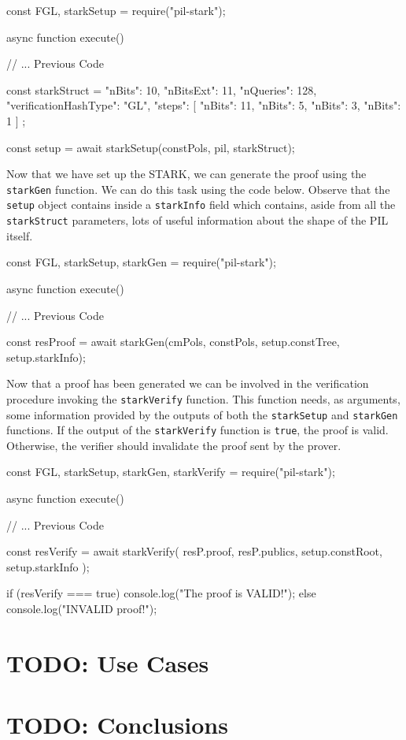 \begin{js}
const { FGL, starkSetup } = require("pil-stark");
    
async function execute() {
    
    // ... Previous Code	
    
    const starkStruct = {
        "nBits": 10,
        "nBitsExt": 11,
        "nQueries": 128,
        "verificationHashType": "GL",
        "steps": [
        {"nBits": 11},
        {"nBits": 5},
        {"nBits": 3},
        {"nBits": 1}
        ]
    };
        
    const setup = await starkSetup(constPols, pil, starkStruct);
}
\end{js}

Now that we have set up the STARK, we can generate the proof using the \texttt{starkGen} function. We can do this task using the code below. Observe that the \texttt{setup} object contains inside a \texttt{starkInfo} field which contains, aside from all the \texttt{starkStruct} parameters, lots of useful information about the shape of the PIL itself. 

\begin{js}
const { FGL, starkSetup, starkGen } = require("pil-stark");

async function execute() {
    
    // ... Previous Code	
    
    const resProof = await starkGen(cmPols, constPols, setup.constTree, setup.starkInfo);
}
\end{js}

Now that a proof has been generated we can be involved in the verification procedure invoking the \texttt{starkVerify} function. This function needs, as arguments, some information provided by the outputs of both the \texttt{starkSetup} and \texttt{starkGen} functions. If the output of the \texttt{starkVerify} function is \texttt{true}, the proof is valid. Otherwise, the verifier should invalidate the proof sent by the prover. 

\begin{js}
const { FGL, starkSetup, starkGen, starkVerify } = require("pil-stark");
    
async function execute() {
        
    // ... Previous Code
    
    const resVerify = await starkVerify(
        resP.proof, resP.publics, setup.constRoot, setup.starkInfo
    );
    
    if (resVerify === true) {
    console.log("The proof is VALID!");
    } else {
    console.log("INVALID proof!");
    }
}
\end{js}












\section{TODO: Use Cases}





\section{TODO: Conclusions} 
